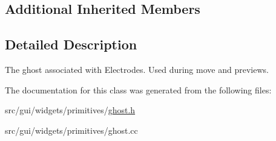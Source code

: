 \subsection*{Additional Inherited Members}


\subsection{Detailed Description}
The ghost associated with Electrodes. Used during move and previews. 

The documentation for this class was generated from the following files\+:\begin{DoxyCompactItemize}
\item 
src/gui/widgets/primitives/\hyperlink{ghost_8h}{ghost.\+h}\item 
src/gui/widgets/primitives/ghost.\+cc\end{DoxyCompactItemize}
